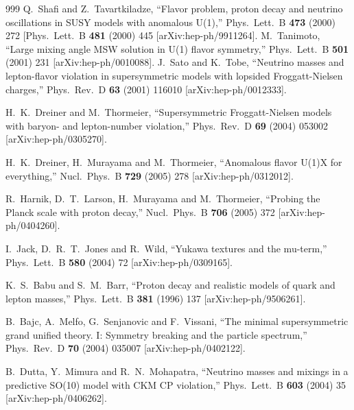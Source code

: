 \begin{thebibliography}{999}
 Q.~Shafi and Z.~Tavartkiladze,
  ``Flavor problem, proton decay and neutrino oscillations in SUSY models  with
  anomalous U(1),''
  Phys.\ Lett.\ B {\bf 473} (2000) 272
  [Phys.\ Lett.\ B {\bf 481} (2000) 445
  [arXiv:hep-ph/9911264].
  M.~Tanimoto,
  ``Large mixing angle MSW solution in U(1) flavor symmetry,''
  Phys.\ Lett.\ B {\bf 501} (2001) 231
  [arXiv:hep-ph/0010088].
J.~Sato and K.~Tobe,
  ``Neutrino masses and lepton-flavor violation in supersymmetric models  with
  lopsided Froggatt-Nielsen charges,''
  Phys.\ Rev.\ D {\bf 63} (2001) 116010
  [arXiv:hep-ph/0012333].

  H.~K.~Dreiner and M.~Thormeier,
  ``Supersymmetric Froggatt-Nielsen models with baryon- and lepton-number
  violation,''
  Phys.\ Rev.\ D {\bf 69} (2004) 053002
  [arXiv:hep-ph/0305270].

  H.~K.~Dreiner, H.~Murayama and M.~Thormeier,
  ``Anomalous flavor U(1)X for everything,''
  Nucl.\ Phys.\ B {\bf 729} (2005) 278
  [arXiv:hep-ph/0312012].

  R.~Harnik, D.~T.~Larson, H.~Murayama and M.~Thormeier,
  ``Probing the Planck scale with proton decay,''
  Nucl.\ Phys.\ B {\bf 706} (2005) 372
  [arXiv:hep-ph/0404260].

  I.~Jack, D.~R.~T.~Jones and R.~Wild,
  ``Yukawa textures and the mu-term,''
  Phys.\ Lett.\ B {\bf 580} (2004) 72
  [arXiv:hep-ph/0309165].

  K.~S.~Babu and S.~M.~Barr,
  ``Proton decay and realistic models of quark and lepton masses,''
  Phys.\ Lett.\ B {\bf 381} (1996) 137
  [arXiv:hep-ph/9506261].

  B.~Bajc, A.~Melfo, G.~Senjanovic and F.~Vissani,
  ``The minimal supersymmetric grand unified theory. I: Symmetry breaking  and
  the particle spectrum,''
  Phys.\ Rev.\ D {\bf 70} (2004) 035007
  [arXiv:hep-ph/0402122].

  B.~Dutta, Y.~Mimura and R.~N.~Mohapatra,
  ``Neutrino masses and mixings in a predictive SO(10) model with CKM CP
  violation,''
  Phys.\ Lett.\ B {\bf 603} (2004) 35
  [arXiv:hep-ph/0406262].


\end{thebibliography}
